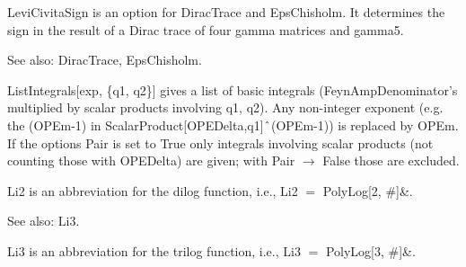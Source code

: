 



LeviCivitaSign is an option for DiracTrace and EpsChisholm. It determines the sign in the result of a Dirac trace of four gamma matrices
  and gamma5.

See also:  DiracTrace, EpsChisholm.



ListIntegrals[exp, \{q1, q2\}] gives a list of basic integrals { }(FeynAmpDenominator's multiplied by scalar products involving q1, q2).
  { }Any non-integer exponent (e.g. the (OPEm-1) in { }ScalarProduct[OPEDelta,q1]\(\RawWedge\)(OPEm-1)) is replaced by OPEm. { }If the
  options Pair is set to True only integrals involving { } scalar products (not counting those with OPEDelta) are given; with Pair
  \(\rightarrow \) False those are excluded.





 Li2 is an abbreviation for the dilog function, i.e., Li2 \(=\) PolyLog[2, \#{}]\&{}.

See also: Li3.


\dispSFinmath{
{{\epsilon }^{\alpha \beta \gamma \delta }}
}


\dispSFinmath{
\{ \} 
}






 Li3 is an abbreviation for the trilog function, i.e., Li3 \(=\) PolyLog[3, \#{}]\&{}.

